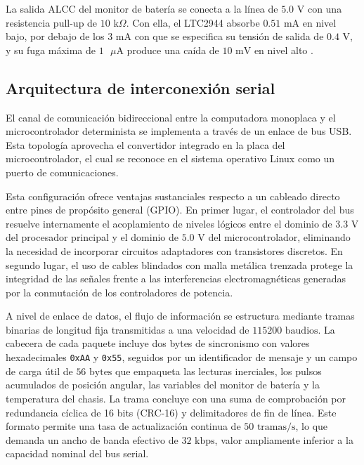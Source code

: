 \documentclass[../../General.tex]{subfiles}
\begin{document}
La salida ALCC del monitor de batería se conecta a la línea de $5.0\text{ V}$ con una resistencia pull-up de $10\text{ k}\Omega$. Con ella, el LTC2944 absorbe $0.51\text{ mA}$ en nivel bajo, por debajo de los $3\text{ mA}$ con que se especifica su tensión de salida de $0.4\text{ V}$, y su fuga máxima de $1\text{ }\mu\text{A}$ produce una caída de $10\text{ mV}$ en nivel alto \citep{adi_ltc2944}.

\subsection{Arquitectura de interconexión serial}\label{subsec:interconexion_serial}

El canal de comunicación bidireccional entre la computadora monoplaca y el microcontrolador determinista se implementa a través de un enlace de bus USB. Esta topología aprovecha el convertidor integrado en la placa del microcontrolador, el cual se reconoce en el sistema operativo Linux como un puerto de comunicaciones.

Esta configuración ofrece ventajas sustanciales respecto a un cableado directo entre pines de propósito general (GPIO). En primer lugar, el controlador del bus resuelve internamente el acoplamiento de niveles lógicos entre el dominio de $3.3\text{ V}$ del procesador principal y el dominio de $5.0\text{ V}$ del microcontrolador, eliminando la necesidad de incorporar circuitos adaptadores con transistores discretos. En segundo lugar, el uso de cables blindados con malla metálica trenzada protege la integridad de las señales frente a las interferencias electromagnéticas generadas por la conmutación de los controladores de potencia.

A nivel de enlace de datos, el flujo de información se estructura mediante tramas binarias de longitud fija transmitidas a una velocidad de $115200\text{ baudios}$. La cabecera de cada paquete incluye dos bytes de sincronismo con valores hexadecimales \texttt{0xAA} y \texttt{0x55}, seguidos por un identificador de mensaje y un campo de carga útil de $56\text{ bytes}$ que empaqueta las lecturas inerciales, los pulsos acumulados de posición angular, las variables del monitor de batería y la temperatura del chasis. La trama concluye con una suma de comprobación por redundancia cíclica de 16 bits (CRC-16) y delimitadores de fin de línea. Este formato permite una tasa de actualización continua de $50\text{ tramas/s}$, lo que demanda un ancho de banda efectivo de $32\text{ kbps}$, valor ampliamente inferior a la capacidad nominal del bus serial.
\end{document}
